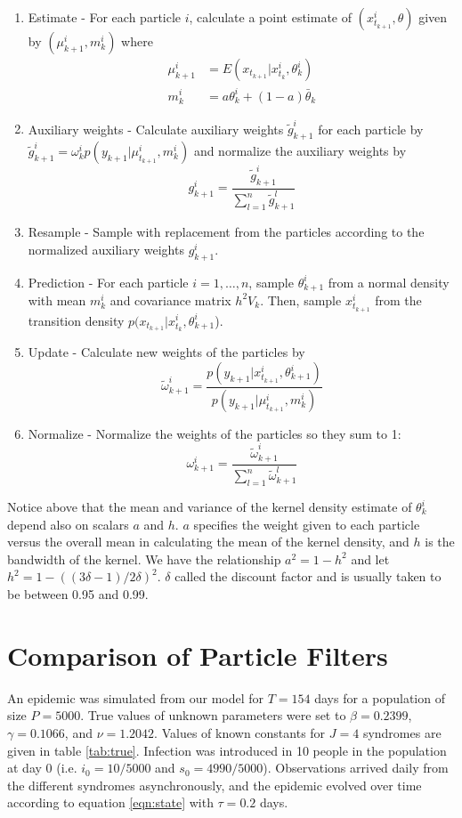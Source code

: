 \documentclass{article}
\begin{document}
\begin{enumerate}
\item Estimate - For each particle $i$, calculate a point estimate of $(x_{t_{k+1}}^i,\theta)$ given by $(\mu_{k+1}^i,m_k^i)$ where
    \begin{align*}
    \mu_{k+1}^i &= E(x_{t_{k+1}}|x_{t_k}^i,\theta_k^i) \\
    m_k^i &= a\theta_k^i + (1-a)\bar{\theta}_k
    \end{align*}
\item Auxiliary weights - Calculate auxiliary weights $\tilde{g}_{k+1}^i$ for each particle by $\tilde{g}_{k+1}^i = \omega_k^i p(y_{k+1}|\mu_{t_{k+1}}^i,m_k^i)$ and normalize the auxiliary weights by \[g_{k+1}^i = \frac{\tilde{g}_{k+1}^i}{\sum_{l=1}^n \tilde{g}_{k+1}^l}\]
\item Resample - Sample with replacement from the particles according to the normalized auxiliary weights $g_{k+1}^i$.
\item Prediction - For each particle $i = {1,\ldots,n}$, sample $\theta_{k+1}^i$ from a normal density with mean $m_k^i$ and covariance matrix $h^2V_k$.  Then, sample $x_{t_{k+1}}^i$ from the transition density $p(x_{t_{k+1}}|x_{t_k}^i,\theta_{k+1}^i$).
\item Update - Calculate new weights of the particles by \[\tilde{\omega}_{k+1}^i = \frac{p(y_{k+1}|x_{t_{k+1}}^i,\theta_{k+1}^i)}{p(y_{k+1}|\mu_{t_{k+1}}^i,m_k^i)}\]
\item Normalize - Normalize the weights of the particles so they sum to 1: \[\omega_{k+1}^i = \frac{\tilde{\omega}_{k+1}^i}{\sum_{l=1}^n \tilde{\omega}_{k+1}^l}\]
\end{enumerate}

Notice above that the mean and variance of the kernel density estimate of $\theta_k^i$ depend also on scalars $a$ and $h$.  $a$ specifies the weight given to each particle versus the overall mean in calculating the mean of the kernel density, and $h$ is the bandwidth of the kernel. We have the relationship $a^2 = 1 - h^2$ and let $h^2 = 1 - ((3\delta - 1)/2\delta)^2$.  $\delta$ called the discount factor and is usually taken to be between 0.95 and 0.99.

\section{Comparison of Particle Filters}

An epidemic was simulated from our model for $T = 154$ days for a population of size $P = 5000$.  True values of unknown parameters were set to $\beta = 0.2399$, $\gamma = 0.1066$, and $\nu = 1.2042$.  Values of known constants for $J = 4$ syndromes are given in table \ref{tab:true}.  Infection was introduced in 10 people in the population at day 0 (i.e. $i_0 = 10/5000$ and $s_0 = 4990/5000$).  Observations arrived daily from the different syndromes asynchronously, and the epidemic evolved over time according to equation \eqref{eqn:state} with $\tau = 0.2$ days.
\end{document}
